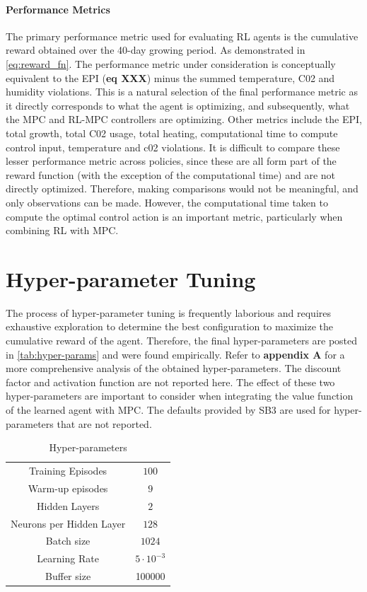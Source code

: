 \paragraph{Performance Metrics}
The primary performance metric used for evaluating RL agents is the cumulative reward obtained over the 40-day growing period. As demonstrated in \autoref{eq:reward_fn}. The performance metric under consideration is conceptually equivalent to the EPI (\textbf{eq XXX}) minus the summed temperature, C02 and humidity violations. This is a natural selection of the final performance metric as it directly corresponds to what the agent is optimizing, and subsequently, what the MPC and RL-MPC controllers are optimizing. Other metrics include the EPI, total growth, total C02 usage, total heating, computational time to compute control input, temperature and c02 violations. It is difficult to compare these lesser performance metric across policies, since these are all form part of the reward function (with the exception of the computational time) and are not directly optimized. Therefore, making comparisons would not be meaningful, and only observations can be made. However, the computational time taken to compute the optimal control action is an important metric, particularly when combining RL with MPC. 

\section{Hyper-parameter Tuning}
The process of hyper-parameter tuning is frequently laborious and requires exhaustive exploration to determine the best configuration to maximize the cumulative reward of the agent. Therefore, the final hyper-parameters are posted in \autoref{tab:hyper-params} and were found empirically. Refer to \textbf{appendix A} for a more comprehensive analysis of the obtained hyper-parameters. The discount factor and activation function are not reported here. The effect of these two hyper-parameters are important to consider when integrating the value function of the learned agent with MPC. The defaults provided by SB3 are used for hyper-parameters that are not reported.

\begin{table}[h]
    \centering
    \begin{tabular}{|c|c|}
    \hline
        Training Episodes & $100$  \\
        Warm-up episodes &  $9$\\
        Hidden Layers & $2$ \\
        Neurons per Hidden Layer& $128$ \\
        Batch size & $1024$ \\
        Learning Rate & $5\cdot 10^{-3}$ \\
        Buffer size & 100000 \\
        \hline
        
    \end{tabular}
    \caption{Hyper-parameters}
    \label{tab:hyper-params}
\end{table}

